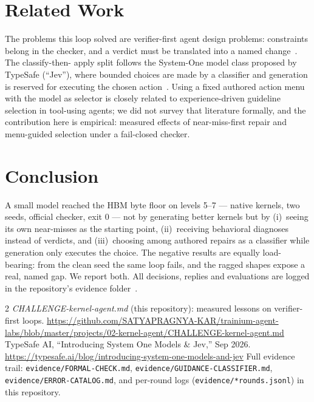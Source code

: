 \documentclass[10pt]{article}
\begin{document}
\section{Related Work}
The problems this loop solved are verifier-first agent design problems: constraints belong in the
checker, and a verdict must be translated into a named change~\cite{challenge}. The classify-then-
apply split follows the System-One model class proposed by TypeSafe (``Jev''), where bounded
choices are made by a classifier and generation is reserved for executing the chosen
action~\cite{jev}. Using a fixed authored action menu with the model as selector is closely
related to experience-driven guideline selection in tool-using agents; we did not survey that
literature formally, and the contribution here is empirical: measured effects of near-miss-first
repair and menu-guided selection under a fail-closed checker.

\section{Conclusion}
A small model reached the HBM byte floor on levels 5--7 --- native kernels, two seeds, official
checker, exit 0 --- not by generating better kernels but by (i)~seeing its own near-misses as the
starting point, (ii)~receiving behavioral diagnoses instead of verdicts, and (iii)~choosing among
authored repairs as a classifier while generation only executes the choice. The negative results
are equally load-bearing: from the clean seed the same loop fails, and the ragged shapes expose a
real, named gap. We report both. All decisions, replies and evaluations are logged in the
repository's evidence folder~\cite{evidence}.

\begin{thebibliography}{2}\small
{} \textit{CHALLENGE-kernel-agent.md} (this repository): measured lessons on
verifier-first loops. \url{https://github.com/SATYAPRAGNYA-KAR/trainium-agent-labs/blob/master/projects/02-kernel-agent/CHALLENGE-kernel-agent.md}
 TypeSafe AI, ``Introducing System One Models \& Jev,'' Sep 2026.
\url{https://typesafe.ai/blog/introducing-system-one-models-and-jev}
 Full evidence trail: \texttt{evidence/FORMAL-CHECK.md},
\texttt{evidence/GUIDANCE-CLASSIFIER.md}, \texttt{evidence/ERROR-CATALOG.md}, and per-round logs
(\texttt{evidence/*rounds.jsonl}) in this repository.
\end{thebibliography}
\end{document}
